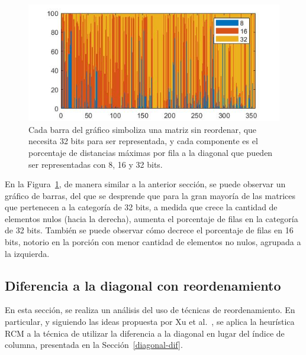 
\begin{figure}[h!]
    \centering
    \includegraphics[width=.8\textwidth]{imagenes/chap4/bar_row_porc_per_cat_32.jpg}
    \caption{Cada barra del gráfico simboliza una matriz sin reordenar, que necesita 32 bits para ser representada, y cada componente es el porcentaje de distancias máximas por fila a la diagonal que pueden ser representadas con 8, 16 y 32 bits.}
    \label{fig:bar_row_porc_per_cat_32}
\end{figure}

 En la Figura~\ref{fig:bar_row_porc_per_cat_32}, de manera similar a la anterior sección,  se puede observar un gráfico de barras, del que se desprende que para la gran mayoría de las matrices que pertenecen a la categoría de 32 bits, a medida que crece la cantidad de elementos nulos (hacia la derecha), aumenta el porcentaje de filas en la categoría de 32 bits. También se puede observar cómo decrece el porcentaje de filas en 16 bits, notorio en la porción con menor cantidad de elementos no nulos, agrupada a la izquierda.
 

\subsection{Diferencia a la diagonal con reordenamiento}\label{diagonal-dif-rcm}

En esta sección, se realiza un análisis del uso de técnicas de reordenamiento. En particular, y siguiendo las ideas propuesta por Xu et al.~\cite{Xu2010}, se aplica la heurística RCM a la técnica de utilizar la diferencia a la diagonal en lugar del índice de columna, presentada en la Sección~\ref{diagonal-dif}.


